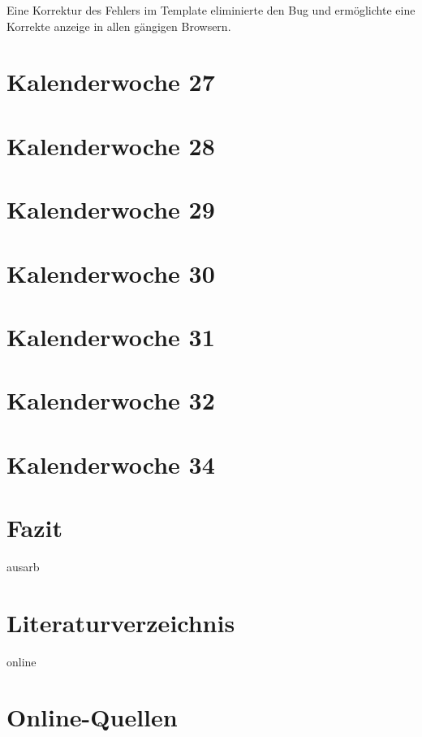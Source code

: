 \documentclass[11pt]{article} %
\begin{document}
Eine Korrektur des Fehlers im Template eliminierte den Bug und ermöglichte eine Korrekte anzeige in allen gängigen Browsern.

\section{Kalenderwoche 27} \label{sec:kw2}



\section{Kalenderwoche 28} \label{sec:kw2}
\section{Kalenderwoche 29} \label{sec:kw2}
\section{Kalenderwoche 30} \label{sec:kw3}
\section{Kalenderwoche 31} \label{sec:kw3}
\section{Kalenderwoche 32} \label{sec:kw3}
\section{Kalenderwoche 34} \label{sec:kw3}
\section{Fazit} \label{sec:faz}

\newpage


\newpage

\listoffigures %
\listoftables %
%
\begin{btSect}{ausarb}
\section*{Literaturverzeichnis}
\btPrintCited
\end{btSect}
\begin{btSect}{online}
\section*{Online-Quellen}
\btPrintCited
\end{btSect}
\end{document}

